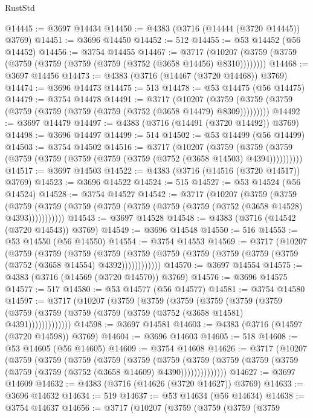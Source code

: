 \begin{lexlean}{RustStd}
\begin{coremodule}
@14445 := @3697 @14434
@14450 := @4383 (@3716 (@14444 (@3720 @14445)) @3769)
@14451 := @3696 @14450
@14452 := 512
@14455 := @53 @14452 (@56 @14452)
@14456 := @3754 @14455
@14467 := @3717
    (@10207 (@3759 (@3759 (@3759 (@3759 (@3759 (@3759 (@3752 (@3658 @14456) @8310))))))))
@14468 := @3697 @14456
@14473 := @4383 (@3716 (@14467 (@3720 @14468)) @3769)
@14474 := @3696 @14473
@14475 := 513
@14478 := @53 @14475 (@56 @14475)
@14479 := @3754 @14478
@14491 := @3717
    (@10207 (@3759 (@3759 (@3759 (@3759 (@3759 (@3759 (@3759 (@3752 (@3658 @14479) @8309)))))))))
@14492 := @3697 @14479
@14497 := @4383 (@3716 (@14491 (@3720 @14492)) @3769)
@14498 := @3696 @14497
@14499 := 514
@14502 := @53 @14499 (@56 @14499)
@14503 := @3754 @14502
@14516 := @3717
    (@10207
      (@3759 (@3759 (@3759 (@3759 (@3759 (@3759 (@3759 (@3759 (@3752 (@3658 @14503) @4394))))))))))
@14517 := @3697 @14503
@14522 := @4383 (@3716 (@14516 (@3720 @14517)) @3769)
@14523 := @3696 @14522
@14524 := 515
@14527 := @53 @14524 (@56 @14524)
@14528 := @3754 @14527
@14542 := @3717
    (@10207
      (@3759
        (@3759
          (@3759 (@3759 (@3759 (@3759 (@3759 (@3759 (@3759 (@3752 (@3658 @14528) @4393)))))))))))
@14543 := @3697 @14528
@14548 := @4383 (@3716 (@14542 (@3720 @14543)) @3769)
@14549 := @3696 @14548
@14550 := 516
@14553 := @53 @14550 (@56 @14550)
@14554 := @3754 @14553
@14569 := @3717
    (@10207
      (@3759
        (@3759
          (@3759
            (@3759 (@3759 (@3759 (@3759 (@3759 (@3759 (@3759 (@3752 (@3658 @14554) @4392))))))))))))
@14570 := @3697 @14554
@14575 := @4383 (@3716 (@14569 (@3720 @14570)) @3769)
@14576 := @3696 @14575
@14577 := 517
@14580 := @53 @14577 (@56 @14577)
@14581 := @3754 @14580
@14597 := @3717
    (@10207
      (@3759
        (@3759
          (@3759
            (@3759
              (@3759
                (@3759 (@3759 (@3759 (@3759 (@3759 (@3759 (@3752 (@3658 @14581) @4391)))))))))))))
@14598 := @3697 @14581
@14603 := @4383 (@3716 (@14597 (@3720 @14598)) @3769)
@14604 := @3696 @14603
@14605 := 518
@14608 := @53 @14605 (@56 @14605)
@14609 := @3754 @14608
@14626 := @3717
    (@10207
      (@3759
        (@3759
          (@3759
            (@3759
              (@3759
                (@3759
                  (@3759
                    (@3759 (@3759 (@3759 (@3759 (@3759 (@3752 (@3658 @14609) @4390))))))))))))))
@14627 := @3697 @14609
@14632 := @4383 (@3716 (@14626 (@3720 @14627)) @3769)
@14633 := @3696 @14632
@14634 := 519
@14637 := @53 @14634 (@56 @14634)
@14638 := @3754 @14637
@14656 := @3717
    (@10207
      (@3759
        (@3759
          (@3759
            (@3759

\end{coremodule}
\end{lexlean}

